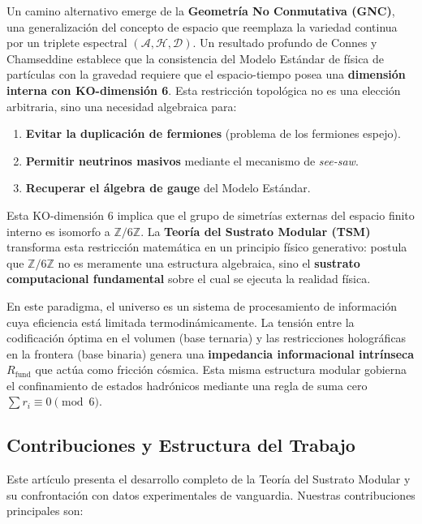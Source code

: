 \documentclass[11pt, a4paper]{article}
\theoremstyle{plain}
\theoremstyle{definition}
\newcommand{\Rfactor}{R_{\text{fund}}}
\begin{document}
Un camino alternativo emerge de la \textbf{Geometría No Conmutativa (GNC)}, una generalización del concepto de espacio que reemplaza la variedad continua por un triplete espectral $(\mathcal{A}, \mathcal{H}, \mathcal{D})$. Un resultado profundo de Connes y Chamseddine \cite{Connes2012} establece que la consistencia del Modelo Estándar de física de partículas con la gravedad requiere que el espacio-tiempo posea una \textbf{dimensión interna con KO-dimensión 6}. Esta restricción topológica no es una elección arbitraria, sino una necesidad algebraica para:

\begin{enumerate}
    \item \textbf{Evitar la duplicación de fermiones} (problema de los fermiones espejo).
    \item \textbf{Permitir neutrinos masivos} mediante el mecanismo de \textit{see-saw}.
    \item \textbf{Recuperar el álgebra de gauge} del Modelo Estándar.
\end{enumerate}

Esta KO-dimensión 6 implica que el grupo de simetrías externas del espacio finito interno es isomorfo a $\mathbb{Z}/6\mathbb{Z}$. La \textbf{Teoría del Sustrato Modular (TSM)} transforma esta restricción matemática en un principio físico generativo: postula que $\mathbb{Z}/6\mathbb{Z}$ no es meramente una estructura algebraica, sino el \textbf{sustrato computacional fundamental} sobre el cual se ejecuta la realidad física.

En este paradigma, el universo es un sistema de procesamiento de información cuya eficiencia está limitada termodinámicamente. La tensión entre la codificación óptima en el volumen (base ternaria) y las restricciones holográficas en la frontera (base binaria) genera una \textbf{impedancia informacional intrínseca} $\Rfactor$ que actúa como fricción cósmica. Esta misma estructura modular gobierna el confinamiento de estados hadrónicos mediante una regla de suma cero $\sum r_i \equiv 0 \pmod{6}$.

\subsection{Contribuciones y Estructura del Trabajo}

Este artículo presenta el desarrollo completo de la Teoría del Sustrato Modular y su confrontación con datos experimentales de vanguardia. Nuestras contribuciones principales son:
\end{document}
